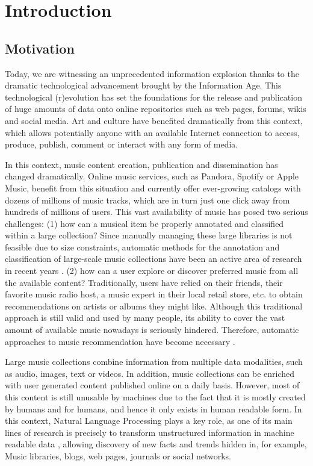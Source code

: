 
\chapter{Introduction}
\label{sec:intro}

\section{Motivation}
\label{sec:intro:motivation}

Today, we are witnessing an unprecedented information explosion thanks to the dramatic technological advancement brought by the Information Age. This technological (r)evolution has set the foundations for the release and publication of huge amounts of data onto online repositories such as web pages, forums, wikis and social media. Art and culture have benefited dramatically from this context, which allows potentially anyone with an available Internet connection to access, produce, publish, comment or interact with any form of media. 

In this context, music content creation, publication and dissemination has changed dramatically. Online music services, such as Pandora, Spotify or Apple Music, benefit from this situation and currently offer ever-growing catalogs with dozens of millions of music tracks, which are in turn just one click away from hundreds of millions of users. This vast availability of music has posed two serious challenges: (1) how can a musical item be properly annotated and classified within a large collection? Since manually managing these large libraries is not feasible due to size constraints, automatic methods for the annotation and classification of large-scale music collections have been an active area of research in recent years \cite{schedl2014music}. (2) how can a user explore or discover preferred music from all the available content? Traditionally, users have relied on their friends, their favorite music radio host, a music expert in their local retail store, etc. to obtain recommendations on artists or albums they might like. Although this traditional approach is still valid and used by many people, its ability to cover the vast amount of available music nowadays is seriously hindered. Therefore, automatic approaches to music recommendation have become necessary \cite{celma2008new}.

Large music collections combine information from multiple data modalities, such as audio, images, text or videos. In addition, music collections can be enriched with user generated content published online on a daily basis. However, most of this content is still unusable by machines due to the fact that it is mostly created by humans and for humans, and hence it only exists in human readable form. In this context, Natural Language Processing plays a key role, as one of its main lines of research is precisely to transform unstructured information in machine readable data \cite{cowie1996information}, allowing discovery of new facts and trends hidden in, for example, Music libraries, blogs, web pages, journals or social networks.

